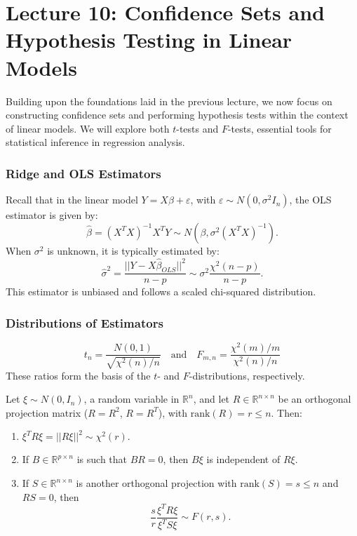 \documentclass[open=any, 11pt,paper=A4]{scrreprt}
\begin{document}
\chapter{Lecture 10: Confidence Sets and Hypothesis Testing in Linear Models}

Building upon the foundations laid in the previous lecture, we now focus on constructing confidence sets and performing hypothesis tests within the context of linear models. We will explore both \(t\)-tests and \(F\)-tests, essential tools for statistical inference in regression analysis.

\subsection*{Ridge and OLS Estimators}

Recall that in the linear model \(Y = X\beta + \varepsilon\), with \(\varepsilon \sim N(0, \sigma^2 I_n)\), the OLS estimator is given by:
\[
\hat{\beta} = (X^TX)^{-1}X^TY \sim N(\beta, \sigma^2 (X^TX)^{-1}).
\]
When \(\sigma^2\) is unknown, it is typically estimated by:
\[
\hat{\sigma}^2 = \frac{||Y - X\hat{\beta}_{OLS}||^2}{n - p} \sim \sigma^2 \frac{\chi^2(n - p)}{n - p}.
\]
This estimator is unbiased and follows a scaled chi-squared distribution.

\subsection*{Distributions of Estimators}

\[
t_n = \frac{N(0,1)}{\sqrt{\chi^2(n)/n}} \quad \text{and} \quad F_{m,n} = \frac{\chi^2(m)/m}{\chi^2(n)/n}
\]
These ratios form the basis of the \(t\)- and \(F\)-distributions, respectively.

\begin{lemma}
Let \(\xi \sim N(0, I_n)\), a random variable in \(\mathbb{R}^n\), and let \(R \in \mathbb{R}^{n \times n}\) be an orthogonal projection matrix (\(R = R^2\), \(R = R^T\)), with \(\text{rank}(R) = r \le n\). Then:
\begin{enumerate}
    \item \(\xi^T R \xi = ||R\xi||^2 \sim \chi^2(r).\)
    \item If \(B \in \mathbb{R}^{p \times n}\) is such that \(BR = 0\), then \(B\xi\) is independent of \(R\xi\).
    \item If \(S \in \mathbb{R}^{n \times n}\) is another orthogonal projection with \(\text{rank}(S) = s \le n\) and \(RS = 0\), then 
    \[
    \frac{s}{r} \frac{\xi^T R \xi}{\xi^T S \xi} \sim F(r, s).
    \]
\end{enumerate}
\end{lemma}
\end{document}
